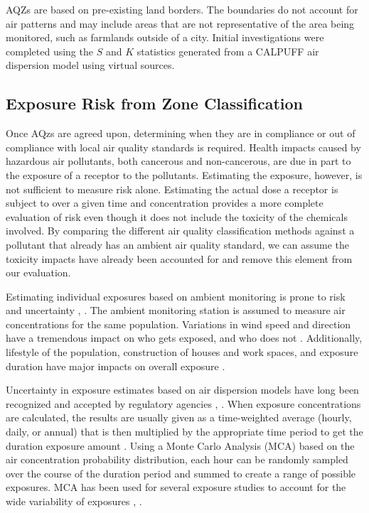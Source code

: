 AQZs are based on pre-existing land borders. The boundaries do not account for air patterns and may include areas that are not representative of the area being monitored, such as farmlands outside of a city. Initial investigations were completed using the $S$ and $K$ statistics generated from a CALPUFF air dispersion model using virtual sources. 

\subsection{Exposure Risk from Zone Classification}

Once AQzs are agreed upon, determining when they are in compliance or out of compliance with local air quality standards is required. Health impacts caused by hazardous air pollutants, both cancerous and non-cancerous, are due in part to the exposure of a receptor to the pollutants. Estimating the exposure, however, is not sufficient to measure risk alone. Estimating the actual dose a receptor is subject to over a given time and concentration provides a more complete evaluation of risk even though it does not include the toxicity of the chemicals involved. By comparing the different air quality classification methods against a pollutant that already has an ambient air quality standard, we can assume the toxicity impacts have already been accounted for and remove this element from our evaluation. 

Estimating individual exposures based on ambient monitoring is prone to risk and uncertainty \cite{Pernigotti2013}, \cite{Thunis2013}.  The ambient monitoring station is assumed to measure air concentrations for the same population.  Variations in wind speed and direction have a tremendous impact on who gets exposed, and who does not \cite{Pratt2012}. Additionally, lifestyle of the population, construction of houses and work spaces, and exposure duration have major impacts on overall exposure \cite{Bell2006}.

Uncertainty in exposure estimates based on air dispersion models have long been recognized and accepted by regulatory agencies \cite{Colvile2002}, \cite{Fox1984}.  When exposure concentrations are calculated, the results are usually given as a time-weighted average (hourly, daily, or annual) that is then multiplied by the appropriate time period to get the duration exposure amount \cite{Zhang2013}. Using a Monte Carlo Analysis (MCA) based on the air concentration probability distribution, each hour can be randomly sampled over the course of the duration period and summed to create a range of possible exposures.  MCA has been used for several exposure studies to account for the wide variability of exposures \cite{Gerharz2013}, \cite{Tan2014}.

